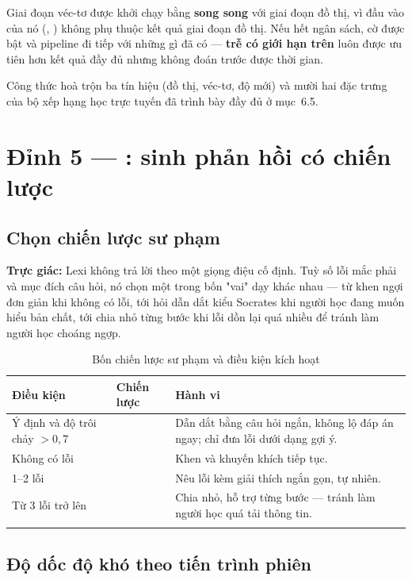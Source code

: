 Giai đoạn véc-tơ được khởi chạy bằng  \textbf{song song} với
giai đoạn đồ thị, vì đầu vào của nó (, ) không phụ
thuộc kết quả giai đoạn đồ thị. Nếu hết ngân sách, cờ  được bật và
pipeline đi tiếp với những gì đã có — \textbf{trễ có giới hạn trên} luôn được ưu tiên hơn
kết quả đầy đủ nhưng không đoán trước được thời gian.

Công thức hoà trộn ba tín hiệu (đồ thị, véc-tơ, độ mới) và mười hai đặc trưng của bộ xếp
hạng học trực tuyến đã trình bày đầy đủ ở mục~6.5.

\section{Đỉnh 5 — : sinh phản hồi có chiến lược}

\subsection{Chọn chiến lược sư phạm}

\textbf{Trực giác:} Lexi không trả lời theo một giọng điệu cố định. Tuỳ số lỗi mắc phải và
mục đích câu hỏi, nó chọn một trong bốn "vai" dạy khác nhau — từ khen ngợi đơn giản khi
không có lỗi, tới hỏi dẫn dắt kiểu Socrates khi người học đang muốn hiểu bản chất, tới chia
nhỏ từng bước khi lỗi dồn lại quá nhiều để tránh làm người học choáng ngợp.

\begin{longtable}{L{3.4cm} L{3.6cm} L{5.6cm}}
\toprule
\textbf{Điều kiện} & \textbf{Chiến lược} & \textbf{Hành vi}\\
\midrule
\endhead
Ý định  và độ trôi chảy $>0{,}7$ &  & Dẫn dắt bằng câu hỏi ngắn, không lộ đáp án ngay; chỉ đưa lỗi dưới dạng gợi ý.\\
Không có lỗi &  & Khen và khuyến khích tiếp tục.\\
1--2 lỗi &  & Nêu lỗi kèm giải thích ngắn gọn, tự nhiên.\\
Từ 3 lỗi trở lên &  & Chia nhỏ, hỗ trợ từng bước — tránh làm người học quá tải thông tin.\\
\bottomrule
\caption{Bốn chiến lược sư phạm và điều kiện kích hoạt}
\end{longtable}

\subsection{Độ dốc độ khó theo tiến trình phiên}

